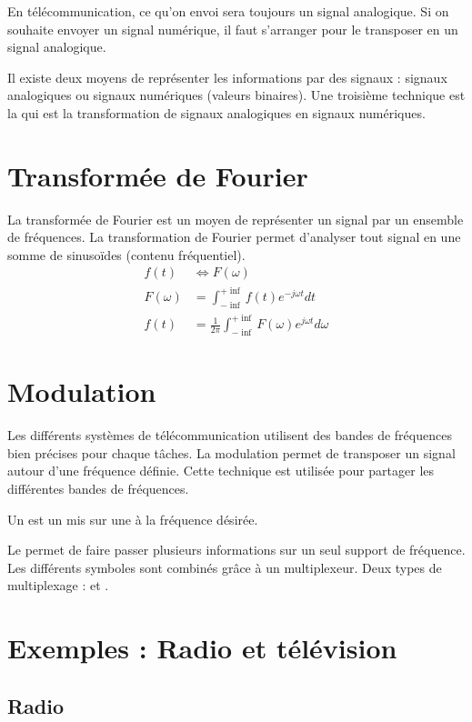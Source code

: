 En télécommunication, ce qu'on envoi sera toujours un signal analogique. Si on souhaite envoyer un signal numérique, il faut s'arranger pour le transposer en un signal analogique.

Il existe deux moyens de représenter les informations par des signaux : signaux analogiques ou signaux numériques (valeurs binaires). Une troisième technique est la  qui est la transformation de signaux analogiques en signaux numériques.

\section{Transformée de Fourier}

La transformée de Fourier est un moyen de représenter un signal par un ensemble de fréquences. La transformation de Fourier permet d'analyser tout signal en une somme de sinusoïdes (contenu fréquentiel).
\begin{align*} 
f(t) &\Leftrightarrow F(\omega)\\
F(\omega) &= \int_{-\inf}^{+\inf} f(t) e^{-j \omega t} dt\\
f(t) &= \frac{1}{2 \pi} \int_{-\inf}^{+\inf} F(\omega) e^{j \omega t} d\omega
\end{align*} 

\section{Modulation}

Les différents systèmes de télécommunication utilisent des bandes de fréquences bien précises pour chaque tâches. La modulation permet de transposer un signal autour d'une fréquence définie. Cette technique est utilisée pour partager les différentes bandes de fréquences.

Un  est un  mis sur une  à la fréquence désirée.

Le  permet de faire passer plusieurs informations sur un seul support de fréquence. Les différents symboles sont combinés grâce à un multiplexeur. Deux types de multiplexage :  et .

\section{Exemples : Radio et télévision}

\subsection{Radio}

